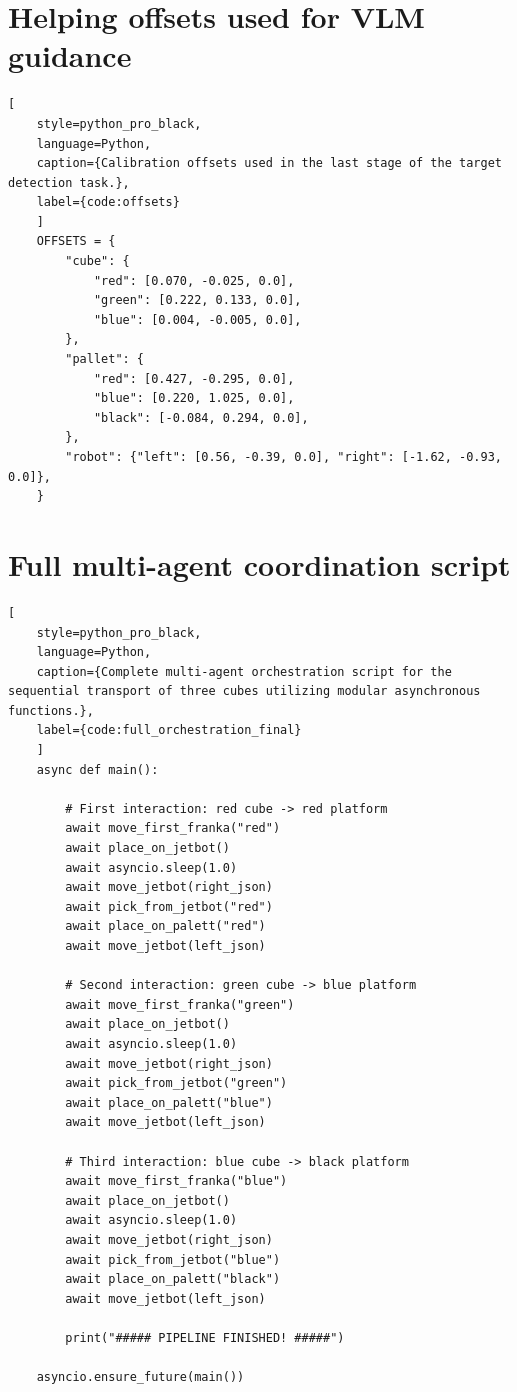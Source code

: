 
\section{Helping offsets used for VLM guidance}
\begin{lstlisting}[
	style=python_pro_black,
	language=Python, 
	caption={Calibration offsets used in the last stage of the target detection task.},
	label={code:offsets}
	]
	OFFSETS = {
		"cube": {
			"red": [0.070, -0.025, 0.0],
			"green": [0.222, 0.133, 0.0],
			"blue": [0.004, -0.005, 0.0],
		},
		"pallet": {
			"red": [0.427, -0.295, 0.0],
			"blue": [0.220, 1.025, 0.0],
			"black": [-0.084, 0.294, 0.0],
		},
		"robot": {"left": [0.56, -0.39, 0.0], "right": [-1.62, -0.93, 0.0]},
	}
\end{lstlisting}

\section{Full multi-agent coordination script}
\label{sec:fullmain}
\begin{lstlisting}[
	style=python_pro_black,
	language=Python, 
	caption={Complete multi-agent orchestration script for the sequential transport of three cubes utilizing modular asynchronous functions.},
	label={code:full_orchestration_final}
	]
	async def main():
	
		# First interaction: red cube -> red platform
		await move_first_franka("red")
		await place_on_jetbot()
		await asyncio.sleep(1.0)
		await move_jetbot(right_json)
		await pick_from_jetbot("red")
		await place_on_palett("red")
		await move_jetbot(left_json)
	
		# Second interaction: green cube -> blue platform
		await move_first_franka("green")
		await place_on_jetbot()
		await asyncio.sleep(1.0)
		await move_jetbot(right_json)
		await pick_from_jetbot("green")
		await place_on_palett("blue")
		await move_jetbot(left_json)
	
		# Third interaction: blue cube -> black platform
		await move_first_franka("blue")
		await place_on_jetbot()
		await asyncio.sleep(1.0)
		await move_jetbot(right_json)
		await pick_from_jetbot("blue")
		await place_on_palett("black")
		await move_jetbot(left_json)
	
		print("##### PIPELINE FINISHED! #####")
	
	asyncio.ensure_future(main())
\end{lstlisting}

